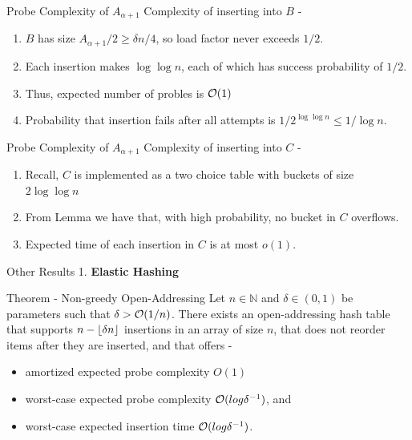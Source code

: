 \documentclass{beamer}
\begin{document}
\begin{frame}{Probe Complexity of $A_{\alpha + 1}$}
	Complexity of inserting into $B$ - 
	\begin{enumerate}
		\item $B$ has size $A_{\alpha + 1}/2 \ge \delta n/4$, so load factor never exceeds $1/2$. 
		\item Each insertion makes $\log{\log{n}}$, each of which has success probability of $1/2$. 
		\item Thus, expected number of probles is ${\cal O}(1)$
		\item Probability that insertion fails after all attempts is $1/2^{\log{\log{n}}} \le 1/ \log{n}$.
	\end{enumerate}
\end{frame}

\begin{frame}{Probe Complexity of $A_{\alpha + 1}$}
	Complexity of inserting into $C$ - 
	\begin{enumerate}
		\item Recall, $C$ is implemented as a two choice table with buckets of size $2\log{\log{n}}$
		\item From Lemma we have that, with high probability, no bucket in $C$ overflows. 
		\item Expected time of each insertion in $C$ is at most $o(1)$.
	\end{enumerate}
\end{frame}



\begin{frame} {Other Results}
	1. {\bf Elastic Hashing}
	\begin{block}{Theorem - Non-greedy Open-Addressing}
		Let $n \in \mathbb{N}$ and $\delta \in(0, 1)$ be parameters such that $\delta > 
		{\cal O}(1/n)$. There exists an open-addressing hash table that supports $n - \left\lfloor \delta n \right\rfloor$ insertions in an array of size $n$, that does not reorder items after they are inserted, and that oﬀers -
		\begin{itemize}
			\item amortized expected probe complexity $O(1)$
			\item worst-case expected probe complexity ${\cal O}(log \delta^{-1})$, and
			\item worst-case expected
			insertion time ${\cal O}(log \delta^{-1})$.
		\end{itemize}
	\end{block}
\end{frame}
\end{document}
